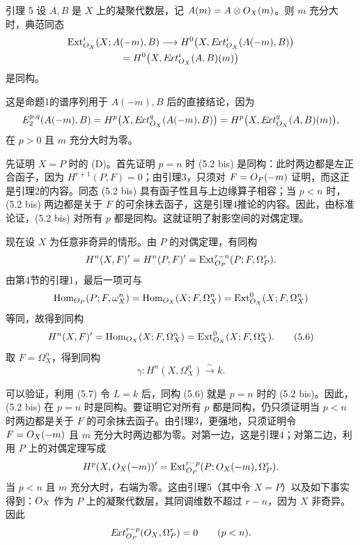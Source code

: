 \begin{statement}{引理 5}
设 $A,B$ 是 $X$ 上的凝聚代数层，记 $A(m)=A\otimes O_X(m)$。则 $m$ 充分大时，典范同态
\begin{gather*}
\operatorname{Ext}_{O_X}^{i}(X;A(-m),B)
\longrightarrow H^0\bigl(X,E\!xt_{O_X}^{i}(A(-m),B)\bigr)\\
=H^0\bigl(X,E\!xt_{O_X}^{i}(A,B)(m)\bigr)
\end{gather*}
是同构。
\end{statement}
这是命题1的谱序列用于 $A(-m),B$ 后的直接结论，因为
\[
E_2^{p,q}(A(-m),B)
=H^p\bigl(X,E\!xt_{O_X}^{q}(A(-m),B)\bigr)
=H^p\bigl(X,E\!xt_{O_X}^{q}(A,B)(m)\bigr),
\]
在 $p>0$ 且 $m$ 充分大时为零。

先证明 $X=P$ 时的 (D)。首先证明 $p=n$ 时 (5.2 bis) 是同构：此时两边都是左正合函子，因为 $H^{r+1}(P,F)=0$；由引理3，只须对 $F=O_P(-m)$ 证明，而这正是引理2的内容。同态 (5.2 bis) 具有函子性且与上边缘算子相容；当 $p<n$ 时，(5.2 bis) 两边都是关于 $F$ 的可余抹去函子，这是引理4推论的内容。因此，由标准论证，(5.2 bis) 对所有 $p$ 都是同构。这就证明了射影空间的对偶定理。

现在设 $X$ 为任意非奇异的情形。由 $P$ 的对偶定理，有同构
\[
H^n(X,F)'=H^n(P,F)'=
\operatorname{Ext}_{O_P}^{r-n}(P;F,\Omega_P^r).
\]
由第4节的引理1，最后一项可与
\[
\operatorname{Hom}_{O_P}(P;F,\omega_X^n)
=\operatorname{Hom}_{O_X}(X;F,\Omega_X^n)
=\operatorname{Ext}_{O_X}^{0}(X;F,\Omega_X^n)
\]
等同，故得到同构
\begin{equation}
H^n(X,F)'=\operatorname{Hom}_{O_X}(X;F,\Omega_X^n)
=\operatorname{Ext}_{O_X}^{0}(X;F,\Omega_X^n).
\tag{5.6}
\end{equation}
取 $F=\Omega_X^n$，得到同构
\begin{equation}
\gamma:H^n(X,\Omega_X^n)\xrightarrow{\sim}k.\tag{5.7}
\end{equation}

可以验证，利用 (5.7) 令 $L=k$ 后，同构 (5.6) 就是 $p=n$ 时的 (5.2 bis)。因此，(5.2 bis) 在 $p=n$ 时是同构。要证明它对所有 $p$ 都是同构，仍只须证明当 $p<n$ 时两边都是关于 $F$ 的可余抹去函子。由引理3，更强地，只须证明令 $F=O_X(-m)$ 且 $m$ 充分大时两边都为零。对第一边，这是引理4；对第二边，利用 $P$ 上的对偶定理写成
\[
H^p(X,O_X(-m))'
=\operatorname{Ext}_{O_P}^{r-p}(P;O_X(-m),\Omega_P^r).
\]
当 $p<n$ 且 $m$ 充分大时，右端为零。这由引理5（其中令 $X=P$）以及如下事实得到：$O_X$ 作为 $P$ 上的凝聚代数层，其同调维数不超过 $r-n$，因为 $X$ 非奇异。因此
\[
E\!xt_{O_P}^{r-p}(O_X,\Omega_P^r)=0\qquad(p<n).
\]

